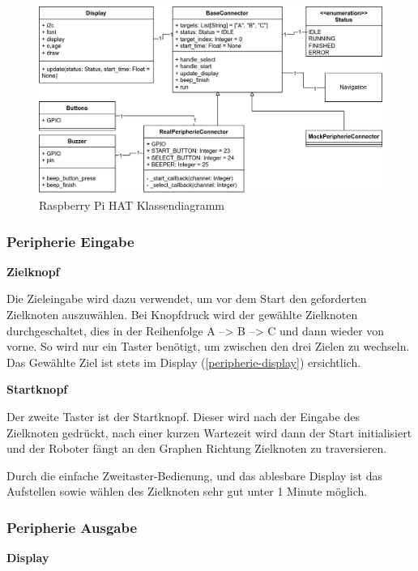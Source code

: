\begin{figure}[H]
    \centering
    \includegraphics[width=\linewidth]{assets/IT/robot-sw-architecture-peripherie.png}
    \caption{Raspberry Pi HAT Klassendiagramm}
    \label{fig:peripherie-classdiagramm}
\end{figure}

\subsubsection{Peripherie Eingabe}
\label{zieleingabe}

\textbf{Zielknopf}

Die Zieleingabe wird dazu verwendet, um vor dem Start den geforderten Zielknoten auszuwählen. Bei Knopfdruck wird der gewählte Zielknoten durchgeschaltet, dies in der Reihenfolge A --> B --> C und dann wieder von vorne. So wird nur ein Taster benötigt, um zwischen den drei Zielen zu wechseln. Das Gewählte Ziel ist stets im Display (\ref{peripherie-display}) ersichtlich.

\textbf{Startknopf}

Der zweite Taster ist der Startknopf. Dieser wird nach der Eingabe des Zielknoten gedrückt, nach einer kurzen Wartezeit wird dann der Start initialisiert und der Roboter fängt an den Graphen Richtung Zielknoten zu traversieren.

Durch die einfache Zweitaster-Bedienung, und das ablesbare Display ist das Aufstellen sowie wählen des Zielknoten sehr gut unter 1 Minute möglich. 

\subsubsection{Peripherie Ausgabe}

\textbf{Display}\label{peripherie-display}

